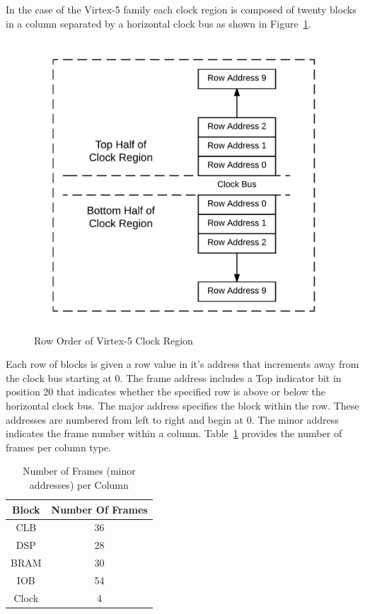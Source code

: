 In the case of the Virtex-5 family each clock region is composed of twenty blocks in a column separated by a horizontal clock bus as shown in Figure~\ref{fig:RowOrder}.
\begin{figure}[]
\centering
\includegraphics[width=.7\linewidth]{Figures/RowOrder}
\caption[Row Order of Virtex-5 Clock Region]{Row Order of Virtex-5 Clock Region}
\label{fig:RowOrder}
\end{figure}
Each row of blocks is given a row value in it's address that increments away from the clock bus starting at 0. 
The frame address includes a Top indicator bit in position 20 that indicates whether the specified row is above or below the horizontal clock bus.
The major address specifies the block within the row.
These addresses are numbered from left to right and begin at 0.
The minor address indicates the frame number within a column. 
Table~\ref{tbl:minorAddressNumbers} provides the number of frames per column type.
\begin{table}[]
	\centering
	\caption{Number of Frames (minor addresses) per Column}
	\label{tbl:minorAddressNumbers}
	\begin{tabular}{|c|c|}
		\hline
		Block             & Number Of Frames \\ \hline
		CLB               & 36               \\ \hline
		DSP               & 28               \\ \hline
		\acrshort{BRAM}   & 30               \\ \hline
		IOB               & 54               \\ \hline
		Clock             & 4                \\ \hline
	\end{tabular}
\end{table}
